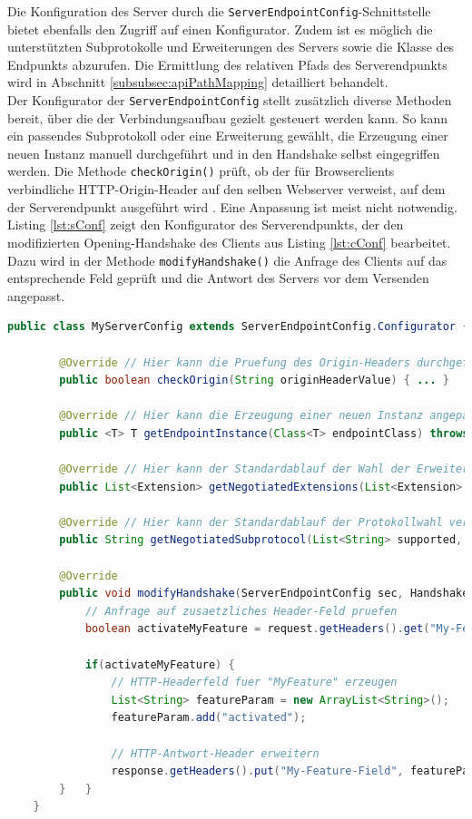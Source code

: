 \documentclass[11pt,a4paper,titlepage]{scrartcl}
\numberwithin{equation}{section}
\begin{document}
\noindent Die Konfiguration des Server durch die \texttt{ServerEndpointConfig}-Schnittstelle bietet ebenfalls den Zugriff auf einen Konfigurator. Zudem ist es möglich die unterstützten Subprotokolle und Erweiterungen des Servers sowie die Klasse des Endpunkts abzurufen. Die Ermittlung des relativen Pfads des Serverendpunkts wird in Abschnitt \ref{subsubsec:apiPathMapping} detailliert behandelt. \\

\noindent Der Konfigurator der \texttt{ServerEndpointConfig} stellt zusätzlich diverse Methoden bereit, über die der Verbindungsaufbau gezielt gesteuert werden kann. So kann ein passendes Subprotokoll oder eine Erweiterung gewählt, die Erzeugung einer neuen Instanz manuell durchgeführt und in den Handshake selbst eingegriffen werden. Die Methode \texttt{checkOrigin()} prüft, ob der für Browserclients verbindliche HTTP-Origin-Header auf den selben Webserver verweist, auf dem der Serverendpunkt ausgeführt wird \autocite[107]{coward_java_2014}. Eine Anpassung ist meist nicht notwendig. Listing \ref{lst:sConf} zeigt den Konfigurator des Serverendpunkts, der den modifizierten Opening-Handshake des Clients aus Listing \ref{lst:cConf} bearbeitet. Dazu wird in der Methode \texttt{modifyHandshake()} die Anfrage des Clients auf das entsprechende Feld geprüft und die Antwort des Servers vor dem Versenden angepasst. \medskip

\begin{lstlisting}[frame=single, language=Java, caption=Java: ServerEndpointConfig-Konfigurationsklasse, label=lst:sConf]
	public class MyServerConfig extends ServerEndpointConfig.Configurator {
	
		@Override // Hier kann die Pruefung des Origin-Headers durchgefuehrt werden
		public boolean checkOrigin(String originHeaderValue) { ... }
		
		@Override // Hier kann die Erzeugung einer neuen Instanz angepasst werden
		public <T> T getEndpointInstance(Class<T> endpointClass) throws InstantiationException { ... }
		
		@Override // Hier kann der Standardablauf der Wahl der Erweiterung veraendert werden
		public List<Extension> getNegotiatedExtensions(List<Extension> installed, List<Extension> requested) { ... }
		
		@Override // Hier kann der Standardablauf der Protokollwahl veraendert werden
		public String getNegotiatedSubprotocol(List<String> supported, List<String> requested) { ... }
		
		@Override
		public void modifyHandshake(ServerEndpointConfig sec, HandshakeRequest request, HandshakeResponse response) {
			// Anfrage auf zusaetzliches Header-Feld pruefen
			boolean activateMyFeature = request.getHeaders().get("My-Feature-Field").get(0).equals("enable");
		
			if(activateMyFeature) {
				// HTTP-Headerfeld fuer "MyFeature" erzeugen
				List<String> featureParam = new ArrayList<String>();
				featureParam.add("activated");
				
				// HTTP-Antwort-Header erweitern
				response.getHeaders().put("My-Feature-Field", featureParam);
		}	}	
	}
\end{lstlisting}
\end{document}
